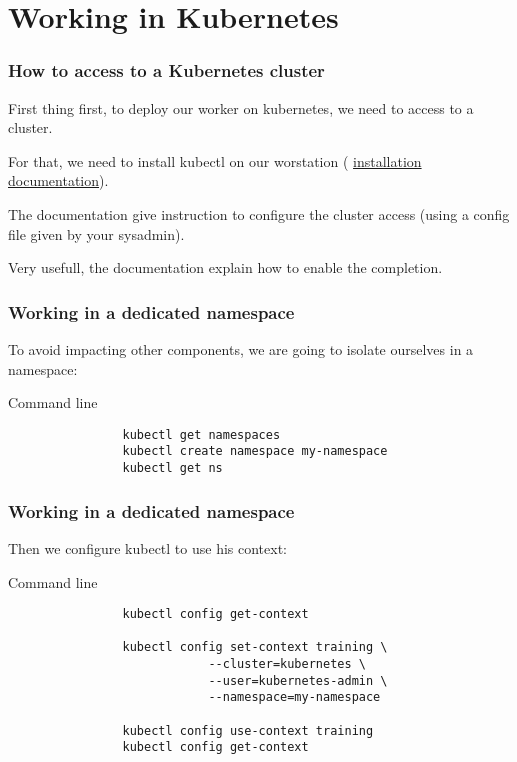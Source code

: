 \section{Working in Kubernetes}

	\begin{frame}
		\frametitle{How to access to a Kubernetes cluster}
		
		First thing first, to deploy our worker on kubernetes, we need to access to a cluster.
		
		\bigskip
		For that, we need to install kubectl on our worstation ( \href{https://kubernetes.io/docs/tasks/tools/install-kubectl/}{installation documentation}).
		 
		 \bigskip
		The documentation give instruction to configure the cluster access (using a config file given by your sysadmin).

		\bigskip		
		Very usefull, the documentation explain how to enable the completion.
	\end{frame}
	
	\begin{frame}[fragile]
		\frametitle{Working in a dedicated namespace}
		
		To avoid impacting other components, we are going to isolate ourselves in a namespace:
		\begin{block}{Command line}
			\begin{verbatim}
				kubectl get namespaces
				kubectl create namespace my-namespace
				kubectl get ns
			\end{verbatim}
		\end{block}
	\end{frame}
		
	\begin{frame}[fragile]
		\frametitle{Working in a dedicated namespace}
	
		Then we configure kubectl to use his context:
		\begin{block}{Command line}
			\begin{verbatim}
				kubectl config get-context
				
				kubectl config set-context training \
							--cluster=kubernetes \
							--user=kubernetes-admin \
							--namespace=my-namespace
							
				kubectl config use-context training
				kubectl config get-context
			\end{verbatim}
		\end{block}
	\end{frame}
	
